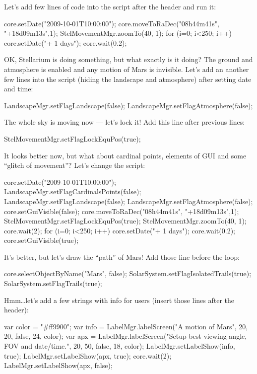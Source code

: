 Let's add few lines of code into the script after the header 
and run it:
\begin{script}
core.setDate("2009-10-01T10:00:00");
core.moveToRaDec("08h44m41s", "+18d09m13s",1);
StelMovementMgr.zoomTo(40, 1);
for (i=0; i<250; i++)
{
      core.setDate("+ 1 days");
      core.wait(0.2);
}
\end{script}

OK, Stellarium is doing something, but what exactly is it
doing? The ground and atmosphere is enabled and any 
motion of Mars is invisible. Let's add an another few 
lines into the script (hiding the landscape and atmosphere) 
after setting date and time:

\begin{script}
LandscapeMgr.setFlagLandscape(false);
LandscapeMgr.setFlagAtmosphere(false);
\end{script}

The whole sky is moving now --- let's lock it! Add this line 
after previous lines:
\begin{script}
StelMovementMgr.setFlagLockEquPos(true);
\end{script}

It looks better now, but what about cardinal points, 
elements of GUI and some ``glitch of movement''? 
Let's change the script:
\begin{script}
core.setDate("2009-10-01T10:00:00");
LandscapeMgr.setFlagCardinalsPoints(false);
LandscapeMgr.setFlagLandscape(false);
LandscapeMgr.setFlagAtmosphere(false);
core.setGuiVisible(false);
core.moveToRaDec("08h44m41s", "+18d09m13s",1);
StelMovementMgr.setFlagLockEquPos(true);
StelMovementMgr.zoomTo(40, 1);
core.wait(2);
for (i=0; i<250; i++)
{
      core.setDate("+ 1 days");
      core.wait(0.2);
}
core.setGuiVisible(true);
\end{script}

It's better, but let's draw the ``path'' of Mars! Add 
those line before the loop:
\begin{script}
core.selectObjectByName("Mars", false);
SolarSystem.setFlagIsolatedTrails(true);
SolarSystem.setFlagTrails(true);
\end{script}

Hmm\ldots let's add a few strings with info for users (insert 
those lines after the header):
\begin{script}
var color = "#ff9900";
var info = LabelMgr.labelScreen("A motion of Mars", 20, 20, 
           false, 24, color);
var apx = LabelMgr.labelScreen("Setup best viewing angle, FOV 
          and date/time.", 20, 50, false, 18, color);
LabelMgr.setLabelShow(info, true);
LabelMgr.setLabelShow(apx, true);
core.wait(2);
LabelMgr.setLabelShow(apx, false);
\end{script}

